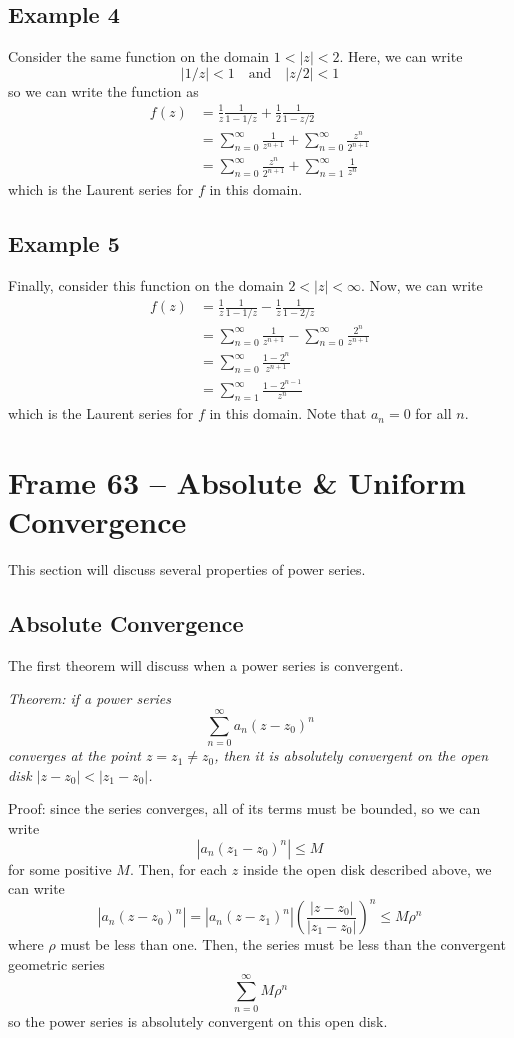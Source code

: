 \documentclass{article}
\begin{document}
\subsection{Example 4}
Consider the same function on the domain $1 < |z| < 2$. Here, we can write
\[
	|1/z| < 1 \quad \text{and} \quad |z/2| < 1
\]
so we can write the function as
\begin{align*}
	f(z)
	&= \frac{1}{z} \frac{1}{1 - 1/z} + \frac{1}{2} \frac{1}{1 - z/2} \\
	&= \sum_{n=0}^\infty \frac{1}{z^{n+1}} + \sum_{n=0}^\infty \frac{z^n}{2^{n+1}} \\
	&= \sum_{n=0}^\infty \frac{z^n}{2^{n+1}} + \sum_{n=1}^\infty \frac{1}{z^n}
\end{align*}
which is the Laurent series for $f$ in this domain.

\subsection{Example 5}
Finally, consider this function on the domain $2 < |z| < \infty$. Now, we can write
\begin{align*}
	f(z)
	&= \frac{1}{z} \frac{1}{1 - 1/z} - \frac{1}{z} \frac{1}{1 - 2/z} \\
	&= \sum_{n=0}^\infty \frac{1}{z^{n+1}} - \sum_{n=0}^\infty \frac{2^n}{z^{n+1}} \\
	&= \sum_{n=0}^\infty \frac{1 - 2^n}{z^{n+1}} \\
	&= \sum_{n=1}^\infty \frac{1 - 2^{n-1}}{z^n}
\end{align*}
which is the Laurent series for $f$ in this domain. Note that $a_n = 0$ for all $n$.


\clearpage
\section{Frame 63 -- Absolute \& Uniform Convergence}
This section will discuss several properties of power series.

\subsection{Absolute Convergence}
The first theorem will discuss when a power series is convergent.

\textit{Theorem: if a power series
\[
	\sum_{n=0}^\infty a_n(z - z_0)^n
\]
converges at the point $z = z_1 \neq z_0$, then it is absolutely convergent on the open disk $|z - z_0| < |z_1 - z_0|$.}

Proof: since the series converges, all of its terms must be bounded, so we can write
\[
	|a_n (z_1 - z_0)^n| \le M
\]
for some positive $M$. Then, for each $z$ inside the open disk described above, we can write
\[
	|a_n (z - z_0)^n | = |a_n (z - z_1)^n | \left(\frac{|z - z_0|}{|z_1 - z_0|}\right)^n \le M\rho^n
\]
where $\rho$ must be less than one. Then, the series must be less than the convergent geometric series
\[
	\sum_{n=0}^\infty M\rho^n
\]
so the power series is absolutely convergent on this open disk.
\end{document}
